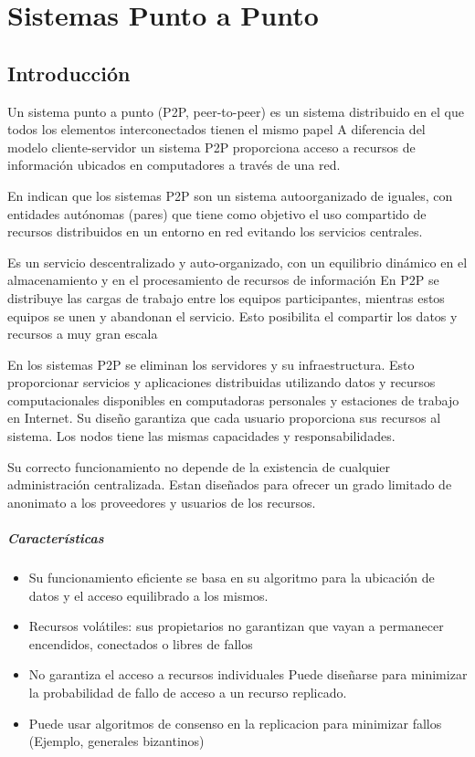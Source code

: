 \setchapterpreamble[u]{\margintoc}

\chapter{Sistemas Punto a Punto}
\label{ch:p2p}

\section{Introducción}
Un sistema punto a punto (P2P, peer-to-peer) es un sistema distribuido en el que todos los elementos interconectados tienen el mismo papel
A diferencia del modelo cliente-servidor un sistema P2P proporciona  acceso a recursos de información ubicados en computadores a través de una red.
 

 En \cite{Steinmetz2005} indican que los  sistemas P2P son un sistema autoorganizado de iguales, con entidades autónomas  (pares) que  tiene como objetivo el uso compartido de recursos distribuidos en un entorno en red evitando los servicios centrales.


Es un servicio descentralizado y auto-organizado, con un equilibrio dinámico en  el almacenamiento  y en el procesamiento de recursos de información
En P2P se distribuye las cargas de trabajo entre los equipos participantes, mientras  estos equipos se unen y abandonan el servicio. Esto posibilita el compartir los  datos y recursos a muy gran escala 
 
En los sistemas P2P se  eliminan los servidores y su infraestructura. Esto proporcionar servicios y aplicaciones distribuidas utilizando datos y recursos computacionales disponibles en computadoras personales y estaciones de trabajo en Internet.  Su diseño garantiza que cada usuario proporciona sus recursos al sistema.  Los nodos  tiene las mismas capacidades y responsabilidades.
 
Su correcto funcionamiento no depende de la existencia de cualquier administración centralizada. Estan diseñados para ofrecer un grado limitado de anonimato a los proveedores y usuarios de los recursos. 
 
 \paragraph{Características} 
 \begin{itemize}
 	\item  Su funcionamiento eficiente se basa en su algoritmo para la ubicación de datos y el acceso equilibrado a los mismos. 
 	\item Recursos volátiles: sus propietarios no garantizan que vayan a permanecer encendidos, conectados o libres de fallos 
 	\item No garantiza el acceso a recursos individuales  
 	Puede diseñarse para minimizar la probabilidad de fallo de acceso a un recurso replicado. 
 	\item Puede usar algoritmos de consenso en la replicacion para minimizar fallos (Ejemplo, generales bizantinos)
	
 \end{itemize}
 
